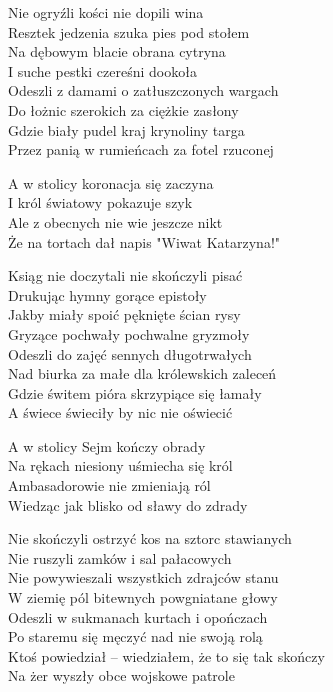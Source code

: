 \begin{text}
    Nie ogryźli kości nie dopili wina\\
    Resztek jedzenia szuka pies pod stołem\\
    Na dębowym blacie obrana cytryna\\
    I suche pestki czereśni dookoła\\
    Odeszli z damami o zatłuszczonych wargach\\
    Do łożnic szerokich za ciężkie zasłony\\
    Gdzie biały pudel kraj krynoliny targa\\
    Przez panią w rumieńcach za fotel rzuconej

    \vin A w stolicy koronacja się zaczyna\\
    \vin I król światowy pokazuje szyk\\
    \vin Ale z obecnych nie wie jeszcze nikt\\
    \vin Że na tortach dał napis "Wiwat Katarzyna!"

    Ksiąg nie doczytali nie skończyli pisać\\
    Drukując hymny gorące epistoły\\
    Jakby miały spoić pęknięte ścian rysy\\
    Gryzące pochwały pochwalne gryzmoły\\
    Odeszli do zajęć sennych długotrwałych\\
    Nad biurka za małe dla królewskich zaleceń\\
    Gdzie świtem pióra skrzypiące się łamały\\
    A świece świeciły by nic nie oświecić

    \vin A w stolicy Sejm kończy obrady\\
    \vin Na rękach niesiony uśmiecha się król\\
    \vin Ambasadorowie nie zmieniają ról\\
    \vin Wiedząc jak blisko od sławy do zdrady

    Nie skończyli ostrzyć kos na sztorc stawianych\\
    Nie ruszyli zamków i sal pałacowych\\
    Nie powywieszali wszystkich zdrajców stanu\\
    W ziemię pól bitewnych powgniatane głowy\\
    Odeszli w sukmanach kurtach i opończach\\
    Po staremu się męczyć nad nie swoją rolą\\
    Ktoś powiedział – wiedziałem, że to się tak skończy\\
    Na żer wyszły obce wojskowe patrole


\end{text}
